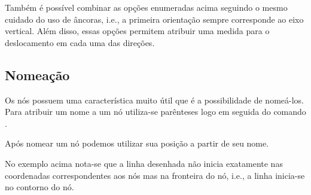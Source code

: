 Tamb\'{e}m \'{e} poss\'{i}vel combinar as op\c{c}\~{o}es enumeradas acima seguindo o mesmo cuidado do uso de \^{a}ncoras, i.e., a primeira orienta\c{c}\~{a}o sempre corresponde ao eixo vertical. Al\'{e}m disso, essas op\c{c}\~{o}es permitem atribuir uma medida para o deslocamento em cada uma das dire\c{c}\~{o}es.


\subsection{Nomea\c{c}\~{a}o}
Os n\'{o}s possuem uma caracter\'{i}stica muito \'{u}til que \'{e} a possibilidade de nome\'{a}-los. Para atribuir um nome a um n\'{o} utiliza-se par\^{e}nteses logo em seguida do comando .


Ap\'{o}s nomear um n\'{o} podemos utilizar sua posi\c{c}\~{a}o a partir de seu nome.


No exemplo acima nota-se que a linha desenhada n\~{a}o inicia exatamente nas coordenadas correspondentes aos n\'{o}s mas na fronteira do n\'{o}, i.e., a linha inicia-se no contorno do n\'{o}.

